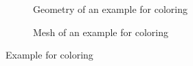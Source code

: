\begin{figure}[h!]
    \begin{subfigure}[b]{0.5\linewidth}
        \centering
        \caption{Geometry of an example for coloring}
    \end{subfigure}
    \begin{subfigure}[b]{0.5\linewidth}
        \centering
        \caption{Mesh of an example for coloring}
    \end{subfigure}
    \caption{Example for coloring}
    \label{qdt_fig:qdt_color_example}
\end{figure}
